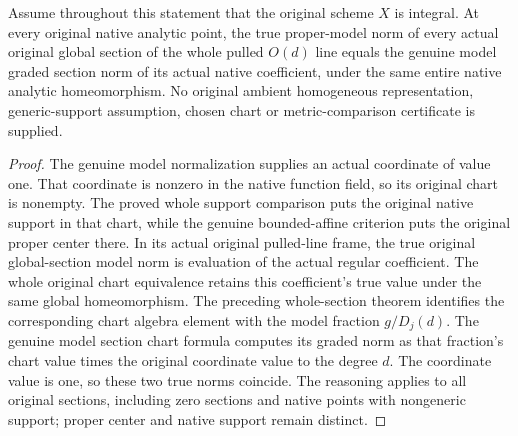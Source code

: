 \begin{theorem}
\label{thm:native-pulled-projective-section-norms}
\leanok
{}
Assume throughout this statement that the original scheme $X$ is integral.
At every original native analytic point, the true proper-model norm of
every actual original global section of the whole pulled $O(d)$ line equals
the genuine model graded section norm of its actual native coefficient,
under the same entire native analytic homeomorphism. No original ambient
homogeneous representation, generic-support assumption, chosen chart or
metric-comparison certificate is supplied.
\end{theorem}
\begin{proof}
The genuine model normalization supplies an actual coordinate of value
one. That coordinate is nonzero in the native function field, so its
original chart is nonempty. The proved whole support comparison puts the
original native support in that chart, while the genuine bounded-affine
criterion puts the original proper center there. In its actual original
pulled-line frame, the true original global-section model norm is evaluation
of the actual regular coefficient. The whole original chart equivalence
retains this coefficient's true value under the same global homeomorphism.
The preceding whole-section theorem identifies the corresponding chart
algebra element with the model fraction $g/D_j(d)$. The genuine model
section chart formula computes its graded norm as that fraction's chart
value times the original coordinate value to the degree $d$. The coordinate
value is one, so these two true norms coincide. The reasoning applies to
all original sections, including zero sections and native points with
nongeneric support; proper center and native support remain distinct.
\end{proof}

